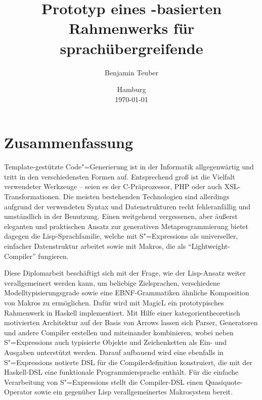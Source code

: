 \documentclass[12pt, a4paper, bibgerm]{scrbook}
\title{Prototyp eines \sexp{}-basierten\\Rahmenwerks für
  sprachübergreifende \\\mprog{}}
\author{Benjamin Teuber}
\date{Hamburg\\\today}
\newcommand{\sexps}{S"=Expressions}
\newcommand{\cgen}{Code"=Generierung}
\newcommand{\mprog}{Metaprogrammierung}
\begin{document}
\thispagestyle{empty}


\section*{\centering Zusammenfassung}
Template-gestützte \cgen{} ist in der Informatik allgegenwärtig und
tritt in den verschiedensten Formen auf. Entsprechend groß ist die
Vielfalt verwendeter Werkzeuge -- seien es der C-Präprozessor, PHP oder
auch XSL-Transformationen. Die meisten bestehenden Technologien sind
allerdings aufgrund der verwendeten Syntax und Datenstrukturen recht
fehleranfällig und umständlich in der Benutzung. Einen weitgehend
vergessenen, aber äußerst eleganten und praktischen Ansatz zur
generativen \mprog{} bietet dagegen die Lisp-Sprachfamilie, welche mit
\sexps{} als universeller, einfacher Datenstruktur arbeitet sowie mit
Makros, die als "`Lightweight-Compiler"' fungieren.

Diese Diplomarbeit beschäftigt sich mit der Frage, wie der Lisp-Ansatz
weiter verallgemeinert werden kann, um beliebige Zielsprachen,
verschiedene Modelltypisierungsgrade sowie eine EBNF-Grammatiken
ähnliche Komposition von Makros zu ermöglichen. Dafür wird mit MagicL
ein prototypisches Rahmenwerk in Haskell implementiert. Mit Hilfe einer
kategorientheoretisch motivierten Architektur auf der Basis von Arrows
lassen sich Parser, Generatoren und andere Compiler erstellen und
miteinander kombinieren, wobei neben \sexps{} auch typisierte Objekte
und Zeichenketten als Ein- und Ausgaben unterstützt werden. Darauf
aufbauend wird eine ebenfalls in \sexps{} notierte DSL für die
Compilerdefinition konstruiert, die mit der Haskell-DSL eine funktionale
Programmiersprache enthält. Für die einfache Verarbeitung von \sexps{}
stellt die Compiler-DSL einen Quasiquote-Operator sowie ein gegenüber
Lisp verallgemeinertes Makrosystem bereit.
\end{document}
